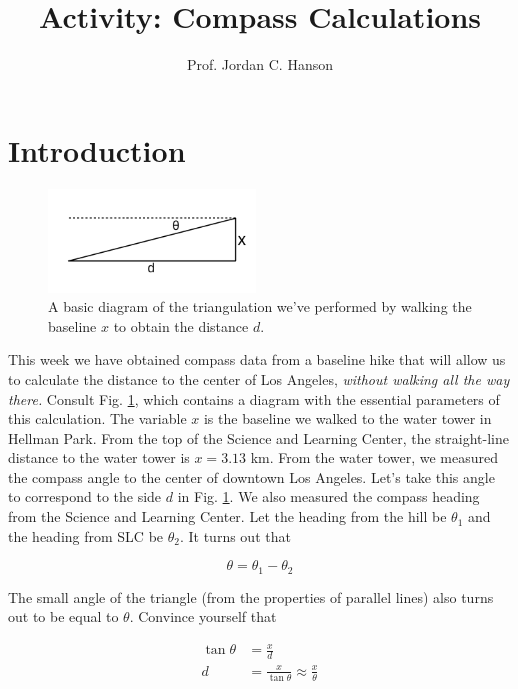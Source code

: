 \documentclass{article}
\begin{document}
\twocolumn

\title{Activity: Compass Calculations}
\author{Prof. Jordan C. Hanson}

\maketitle

\section{Introduction}

\begin{figure}[ht]
\centering
\includegraphics[width=0.49\textwidth]{CompassTriangle.pdf}
\caption{\label{fig:triang} A basic diagram of the triangulation we've performed by walking the baseline $x$ to obtain the distance $d$.}
\end{figure}

This week we have obtained compass data from a baseline hike that will allow us to calculate the distance to the center of Los Angeles, \textit{without walking all the way there.}  Consult Fig. \ref{fig:triang}, which contains a diagram with the essential parameters of this calculation.  The variable $x$ is the baseline we walked to the water tower in Hellman Park.  From the top of the Science and Learning Center, the straight-line distance to the water tower is $x = 3.13$ km.  From the water tower, we measured the compass angle to the center of downtown Los Angeles.  Let's take this angle to correspond to the side $d$ in Fig. \ref{fig:triang}.  We also measured the compass heading from the Science and Learning Center.  Let the heading from the hill be $\theta_1$ and the heading from SLC be $\theta_2$.  It turns out that 

\begin{equation}
\theta = \theta_1 - \theta_2
\end{equation}

The small angle of the triangle (from the properties of parallel lines) also turns out to be equal to $\theta$.  Convince yourself that 

\begin{align}
\tan\theta &= \frac{x}{d} \\
d &= \frac{x}{\tan\theta} \approx \frac{x}{\theta} \label{eq:theone}
\end{align}
\end{document}

